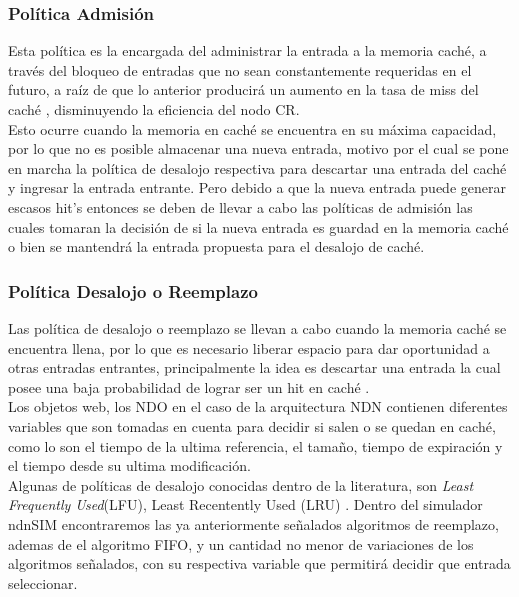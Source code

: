 \documentclass[12pt]{ociamthesis}  %
\begin{document}
\subsubsection{Política Admisión}
Esta política es la encargada del administrar la entrada a la memoria caché, a través del bloqueo de entradas que no sean constantemente requeridas en el futuro, a raíz de que lo anterior producirá un aumento en la tasa de miss del caché \cite{baeza2007admission}, disminuyendo la eficiencia del nodo CR.\\

Esto ocurre cuando la memoria en caché se encuentra en su máxima capacidad, por lo que no es posible almacenar una nueva entrada, motivo por el cual se pone en marcha la política de desalojo respectiva para descartar una entrada del caché y ingresar la entrada entrante. Pero debido a que la nueva entrada puede generar escasos hit's entonces se deben de llevar a cabo las políticas de admisión las cuales tomaran la decisión de si la nueva entrada es guardad en la memoria caché o bien se mantendrá la entrada propuesta para el desalojo de caché.\\

\subsubsection{Política Desalojo o Reemplazo}
Las política de desalojo o reemplazo se llevan a cabo cuando la memoria caché se encuentra llena, por lo que es necesario liberar espacio para dar oportunidad a otras entradas entrantes, principalmente la idea es descartar una entrada la cual posee una baja probabilidad de lograr ser un hit en caché \cite{baeza2007admission}.\\

Los objetos web, los NDO en el caso de la arquitectura NDN contienen diferentes variables que son tomadas en cuenta para decidir si salen o se quedan en caché, como lo son el tiempo de la ultima referencia, el tamaño, tiempo de expiración y el tiempo desde su ultima modificación.\\

Algunas de políticas de desalojo conocidas dentro de la literatura, son \textit{Least Frequently Used}(LFU), Least Recentently Used
(LRU) \cite{gomez2014servicios}\cite{gan2009improved}\cite{cambazoglu2010refreshing}. Dentro del simulador ndnSIM encontraremos las ya anteriormente señalados algoritmos de reemplazo, ademas de el algoritmo FIFO, y un cantidad no menor de variaciones de los algoritmos señalados, con su respectiva variable que permitirá decidir que entrada seleccionar.\\
\end{document}
